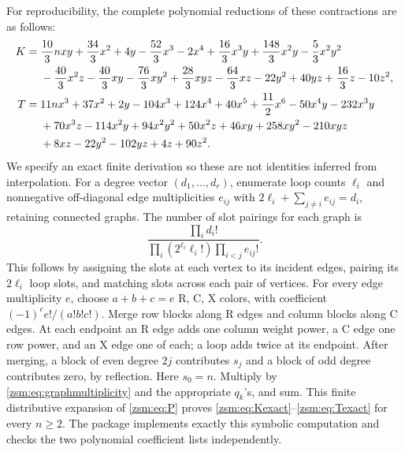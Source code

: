 \documentclass[11pt]{article}
\theoremstyle{definition}\newtheorem{definition}[theorem]{Definition}
\theoremstyle{remark}\newtheorem{remark}[theorem]{Remark}
\begin{document}
For reproducibility, the complete polynomial reductions of these contractions
are as follows:
\begin{align}
 K={}&\frac{10}3nxy+\frac{34}3x^2+4y
 -\frac{52}3x^3-2x^4+\frac{16}3x^3y+\frac{148}3x^2y
 -\frac53x^2y^2\notag\\
 &-\frac{40}3x^2z-\frac{40}3xy-\frac{76}3xy^2
 +\frac{28}3xyz-\frac{64}3xz-22y^2+40yz+\frac{16}3z-10z^2,
 \label{zsm:eq:Kexact}\\
 T={}&11nx^3+37x^2+2y-104x^3+124x^4+40x^5+\frac{11}2x^6
 -50x^4y-232x^3y\notag\\
 &+70x^3z-114x^2y+94x^2y^2+50x^2z+46xy+258xy^2
 -210xyz\notag\\
 &+8xz-22y^2-102yz+4z+90z^2.\label{zsm:eq:Texact}
\end{align}
We specify an exact finite derivation so these are not identities inferred
from interpolation. For a degree vector $(d_1,\ldots,d_r)$, enumerate loop
counts $\ell_i$ and nonnegative off-diagonal edge multiplicities $e_{ij}$ with
$2\ell_i+\sum_{j\ne i}e_{ij}=d_i$, retaining connected graphs. The number of
slot pairings for each graph is
\begin{equation}\label{zsm:eq:graphmultiplicity}
 \frac{\prod_i d_i!}
      {\prod_i(2^{\ell_i}\ell_i!)\prod_{i<j}e_{ij}!}.
\end{equation}
This follows by assigning the slots at each vertex to its incident edges,
pairing its $2\ell_i$ loop slots, and matching slots across each pair of
vertices. For every edge multiplicity $e$, choose $a+b+c=e$ R, C, X colors,
with coefficient $(-1)^c e!/(a!b!c!)$. Merge row blocks along R edges and
column blocks along C edges. At each endpoint an R edge adds one column
weight power, a C edge one row power, and an X edge one of each; a loop adds
twice at its endpoint. After merging, a block of even degree $2j$ contributes
$s_j$ and a block of odd degree contributes zero, by reflection. Here $s_0=n$.
Multiply by \eqref{zsm:eq:graphmultiplicity} and the appropriate $q_k$'s, and sum.
This finite distributive expansion of \eqref{zsm:eq:P} proves
\eqref{zsm:eq:Kexact}--\eqref{zsm:eq:Texact} for every $n\ge2$. The package implements
exactly this symbolic computation and checks the two polynomial coefficient
lists independently.
\end{document}
